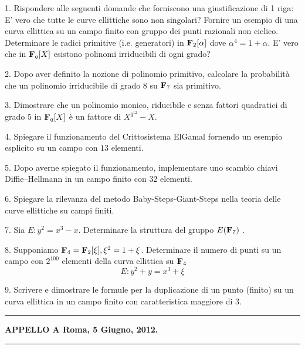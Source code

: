 \item{1.} Rispondere alle seguenti domande che forniscono una giustificazione di 1 riga:\bigskip
{} E' vero che tutte le curve ellittiche sono non singolari?
 Fornire un esempio di una curva ellittica su un campo finito con gruppo dei
punti razionali non ciclico.
 Determinare le radici primitive (i.e. generatori) in ${\bf F}_2[\alpha]$ dove $\alpha^4=1+\alpha$.
 E' vero che in ${\bf F}_q[X]$ esistono polinomi irriducibili di ogni grado?
\item{2.} Dopo aver definito la nozione di polinomio primitivo, calcolare la probabilit\`a che un polinomio irriducibile di grado $8$ su ${\bf F}_7$ sia 
primitivo.
\item{3.} Dimostrare che un polinomio monico, riducibile e senza fattori quadratici di grado $5$ in ${\bf F}_q[X]$ \`e un
fattore di $X^{q^{12}}-X$. \item{4.} Spiegare il funzionamento del Crittosistema ElGamal fornendo un esempio esplicito su un campo con $13$ elementi.
\item{5.} Dopo averne spiegato il funzionamento, implementare uno scambio chiavi Diffie--Hellmann in un campo finito
con $32$ elementi.
\item{6.} Spiegare la rilevanza del metodo Baby-Steps-Giant-Steps nella teoria delle curve ellittiche su campi finiti.
\item{7.} Sia $E: y^2=x^3-x$. Determinare la struttura del gruppo $E({\bf F}_7)$ .
\item{8.} Supponiamo ${\bf F}_4={\bf F}_2[\xi], \xi^2=1+\xi$. 
Determinare il numero di punti su un campo con $2^{100}$ elementi della curva ellittica su ${\bf F}_4$ 
$$E: y^2+y=x^3+\xi$$
\item{9.} Scrivere e dimostrare le formule per la duplicazione di un punto (finito) su un curva ellittica in un campo
finito con caratteristica maggiore di $3$.
\bigskip

\hrule
\centerline{{\bf APPELLO A \hfill Roma, 5 Giugno, 2012.}}\hrule

